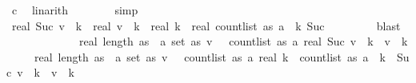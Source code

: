 \begin{isabellebody}
\ c{\isacharunderscore}{\kern0pt}{}\ \isamarkupfalse%
\ linarith\isanewline
\ \ \ \ \ \ \isamarkupfalse%
\ simp{\isacharplus}{\kern0pt}\isanewline
\ \ \ \ \isamarkupfalse%
\ \isamarkupfalse%
\ {\isachardoublequoteopen}real\ {\isacharparenleft}{\kern0pt}Suc\ v\ {\isacharcircum}{\kern0pt}\ k{\isacharparenright}{\kern0pt}\ {\isacharminus}{\kern0pt}\ real\ {\isacharparenleft}{\kern0pt}v\ {\isacharcircum}{\kern0pt}\ k{\isacharparenright}{\kern0pt}\ {\isasymle}\ real\ k\ {\isacharasterisk}{\kern0pt}\ real\ {\isacharparenleft}{\kern0pt}count{\isacharunderscore}{\kern0pt}list\ as\ a{\isacharparenright}{\kern0pt}\ {\isacharcircum}{\kern0pt}\ {\isacharparenleft}{\kern0pt}k{\isacharminus}{\kern0pt}\ Suc\ {}{\isacharparenright}{\kern0pt}{\isachardoublequoteclose}\isanewline
\ \ \ \ \ \ \isamarkupfalse%
\ blast\isanewline
\ \ \isamarkupfalse%
\isanewline
\ \ \ \ \ \ \isanewline
\ \ \isamarkupfalse%
\ {\isachardoublequoteopen}real\ {\isacharparenleft}{\kern0pt}length\ as{\isacharparenright}{\kern0pt}\ {\isacharasterisk}{\kern0pt}\ {\isacharparenleft}{\kern0pt}{\isasymSum}a{\isasymin}\ set\ as{\isachardot}{\kern0pt}\ {\isacharparenleft}{\kern0pt}{\isasymSum}v\ {\isasymin}\ {\isacharbraceleft}{\kern0pt}{}{\isachardot}{\kern0pt}{\isachardot}{\kern0pt}{\isacharless}{\kern0pt}\ count{\isacharunderscore}{\kern0pt}list\ as\ a{\isacharbraceright}{\kern0pt}{\isachardot}{\kern0pt}\ {\isacharparenleft}{\kern0pt}real\ {\isacharparenleft}{\kern0pt}Suc\ v\ {\isacharcircum}{\kern0pt}\ k\ {\isacharminus}{\kern0pt}\ v\ {\isacharcircum}{\kern0pt}\ k{\isacharparenright}{\kern0pt}{\isacharparenright}{\kern0pt}\isanewline
\ \ \ \ {\isasymle}\ real\ {\isacharparenleft}{\kern0pt}length\ as{\isacharparenright}{\kern0pt}\ {\isacharasterisk}{\kern0pt}\ {\isacharparenleft}{\kern0pt}{\isasymSum}a{\isasymin}\ set\ as{\isachardot}{\kern0pt}\ {\isacharparenleft}{\kern0pt}{\isasymSum}v\ {\isasymin}\ {\isacharbraceleft}{\kern0pt}{}{\isachardot}{\kern0pt}{\isachardot}{\kern0pt}{\isacharless}{\kern0pt}\ count{\isacharunderscore}{\kern0pt}list\ as\ a{\isacharbraceright}{\kern0pt}{\isachardot}{\kern0pt}\ {\isacharparenleft}{\kern0pt}real\ {\isacharparenleft}{\kern0pt}k\ {\isacharasterisk}{\kern0pt}\ count{\isacharunderscore}{\kern0pt}list\ as\ a\ {\isacharcircum}{\kern0pt}\ {\isacharparenleft}{\kern0pt}k{\isacharminus}{\kern0pt}{}{\isacharparenright}{\kern0pt}\ {\isacharasterisk}{\kern0pt}\ {\isacharparenleft}{\kern0pt}Suc\ v\ {\isacharcircum}{\kern0pt}\ k\ {\isacharminus}{\kern0pt}\ v\ {\isacharcircum}{\kern0pt}\ k{\isacharparenright}{\kern0pt}{\isacharparenright}{\kern0pt}{\isacharparenright}{\kern0pt}{\isacharparenright}{\kern0pt}{\isacharparenright}{\kern0pt}{\isachardoublequoteclose}\isanewline

\end{isabellebody}
